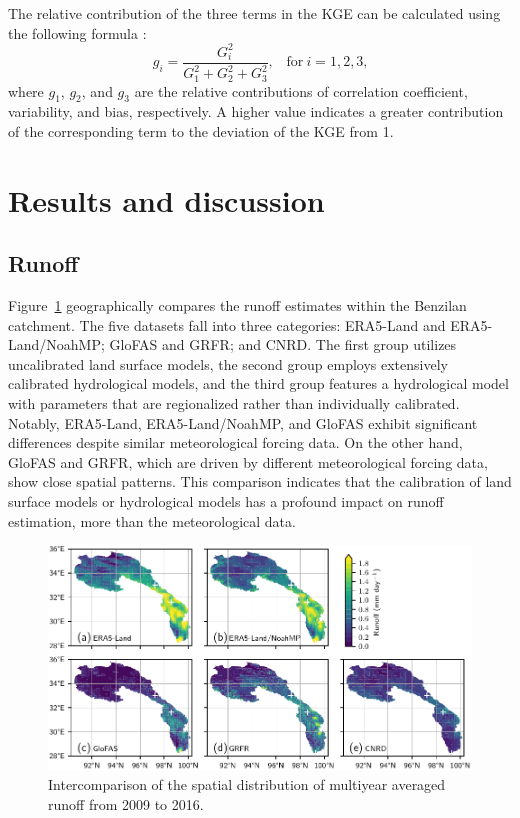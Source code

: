 \documentclass[water,article,submit,pdftex,moreauthors]{Definitions/mdpi}
\begin{document}
The relative contribution of the three terms in the KGE can be calculated using the following formula \citep{gupta2009JH}:
\begin{equation}
  g_i = \frac{G_i^2}{G_1^2 + G_2^2 + G_3^2} \text{,} \quad \text{for}
  \  i = 1, 2, 3 \text{,}
\end{equation}
where $g_1$, $g_2$, and $g_3$ are the relative contributions of correlation coefficient, variability, and bias, respectively. A higher value indicates a greater contribution of the corresponding term to the deviation of the KGE from 1.

\section{Results and discussion}

\subsection{Runoff}

Figure~\ref{fig:runoff_spatial} geographically compares the runoff estimates within the Benzilan catchment. The five datasets fall into three categories: ERA5-Land and ERA5-Land/NoahMP; GloFAS and GRFR; and CNRD. The first group utilizes uncalibrated land surface models, the second group employs extensively calibrated hydrological models, and the third group features a hydrological model with parameters that are regionalized rather than individually calibrated. Notably, ERA5-Land, ERA5-Land/NoahMP, and GloFAS exhibit significant differences despite similar meteorological forcing data. On the other hand, GloFAS and GRFR, which are driven by different meteorological forcing data, show close spatial patterns. This comparison indicates that the calibration of land surface models or hydrological models has a profound impact on runoff estimation, more than the meteorological data.

\begin{figure}[H]
  \centering
  \includegraphics[width=\textwidth]{runoff_mean.pdf}
  \caption{Intercomparison of the spatial distribution of multiyear averaged runoff from 2009 to 2016.\label{fig:runoff_spatial}}
\end{figure}
\end{document}
